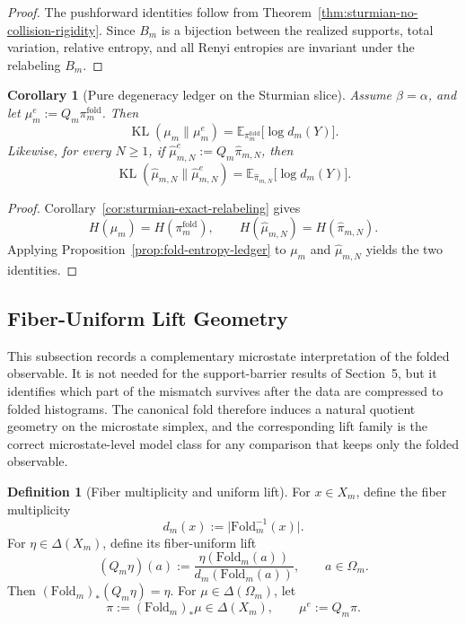 \documentclass[11pt,letterpaper]{article}
\numberwithin{equation}{section}
\theoremstyle{plain}
\newtheorem{corollary}[theorem]{Corollary}
\theoremstyle{definition}
\newtheorem{definition}[theorem]{Definition}
\theoremstyle{remark}
\newcommand{\Fold}{\mathrm{Fold}}
\DeclareMathOperator{\KL}{KL}
\begin{document}
\begin{proof}
The pushforward identities follow from Theorem~\ref{thm:sturmian-no-collision-rigidity}.
Since \(B_m\) is a bijection between the realized supports, total variation,
relative entropy, and all Renyi entropies are invariant under the relabeling
\(B_m\).
\end{proof}

\begin{corollary}[Pure degeneracy ledger on the Sturmian slice]\label{cor:sturmian-pure-degeneracy-ledger}
Assume \(\beta=\alpha\), and let \(\mu_m^e:=Q_m\pi_m^{\mathrm{fold}}\). Then
\[
\KL(\mu_m\|\mu_m^e)
=
\mathbb{E}_{\pi_m^{\mathrm{fold}}}\bigl[\log d_m(Y)\bigr].
\]
Likewise, for every \(N\ge 1\), if \(\hat\mu_{m,N}^e:=Q_m\hat\pi_{m,N}\), then
\[
\KL(\hat\mu_{m,N}\|\hat\mu_{m,N}^e)
=
\mathbb{E}_{\hat\pi_{m,N}}\bigl[\log d_m(Y)\bigr].
\]
\end{corollary}

\begin{proof}
Corollary~\ref{cor:sturmian-exact-relabeling} gives
\[
H(\mu_m)=H(\pi_m^{\mathrm{fold}}),
\qquad
H(\hat\mu_{m,N})=H(\hat\pi_{m,N}).
\]
Applying Proposition~\ref{prop:fold-entropy-ledger} to \(\mu_m\) and
\(\hat\mu_{m,N}\) yields the two identities.
\end{proof}

\subsection{Fiber-Uniform Lift Geometry}

This subsection records a complementary microstate interpretation of the folded
observable. It is not needed for the support-barrier results of Section~5, but
it identifies which part of the mismatch survives after the data are compressed
to folded histograms. The canonical fold therefore induces a natural quotient
geometry on the microstate simplex, and the corresponding lift family is the
correct microstate-level model class for any comparison that keeps only the
folded observable.

\begin{definition}[Fiber multiplicity and uniform lift]\label{def:fiber-uniform-lift}
For \(x\in X_m\), define the fiber multiplicity
\[
d_m(x):=\bigl|\Fold_m^{-1}(x)\bigr|.
\]
For \(\eta\in\Delta(X_m)\), define its fiber-uniform lift
\[
(Q_m\eta)(a):=\frac{\eta(\Fold_m(a))}{d_m(\Fold_m(a))},
\qquad a\in\Omega_m.
\]
Then \((\Fold_m)_*(Q_m\eta)=\eta\). For \(\mu\in\Delta(\Omega_m)\), let
\[
\pi:=(\Fold_m)_*\mu\in\Delta(X_m),
\qquad
\mu^e:=Q_m\pi.
\]
\end{definition}
\end{document}
